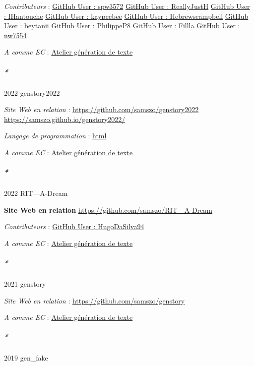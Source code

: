\documentclass[
  a4paper,
  DIV=11,
  numbers=noendperiod]{scrreprt}
\let\oldsubparagraph\subparagraph
\renewcommand{\subparagraph}[1]{\oldsubparagraph{#1}\mbox{}}
\begin{document}
\emph{Contributeurs} :
\href{http://localhost/samszo/omk/s/fiches/item/301047}{GitHub User :
spw3572} \href{http://localhost/samszo/omk/s/fiches/item/301049}{GitHub
User : ReallyJustH}
\href{http://localhost/samszo/omk/s/fiches/item/300833}{GitHub User :
IHantouche}
\href{http://localhost/samszo/omk/s/fiches/item/300841}{GitHub User :
kaypeebee}
\href{http://localhost/samszo/omk/s/fiches/item/301051}{GitHub User :
Hebrewscampbell}
\href{http://localhost/samszo/omk/s/fiches/item/301053}{GitHub User :
beytanii} \href{http://localhost/samszo/omk/s/fiches/item/300741}{GitHub
User : PhilippeP8}
\href{http://localhost/samszo/omk/s/fiches/item/301055}{GitHub User :
Fillla} \href{http://localhost/samszo/omk/s/fiches/item/301057}{GitHub
User : nw7554}

\emph{A comme EC} :
\href{http://localhost/samszo/omk/s/fiches/item/299446}{Atelier
génération de texte}

\subparagraph*{2022 genstory2022}\label{sec-item301828}

\emph{Site Web en relation} :
\url{https://github.com/samszo/genstory2022}
\url{https://samszo.github.io/genstory2022/}

\emph{Langage de programmation} :
\href{http://localhost/samszo/omk/s/fiches/item/96621}{html}

\emph{A comme EC} :
\href{http://localhost/samszo/omk/s/fiches/item/299446}{Atelier
génération de texte}

\subparagraph*{2022 RIT---A-Dream}\label{sec-item301874}

\textbf{Site Web en relation}
\href{https://github.com/samszo/RIT---A-Dream}{https://github.com/samszo/RIT---A-Dream}

\emph{Contributeurs} :
\href{http://localhost/samszo/omk/s/fiches/item/301513}{GitHub User :
HugoDaSilva94}

\emph{A comme EC} :
\href{http://localhost/samszo/omk/s/fiches/item/299446}{Atelier
génération de texte}

\subparagraph*{2021 genstory}\label{sec-item301888}

\emph{Site Web en relation} : \url{https://github.com/samszo/genstory}

\emph{A comme EC} :
\href{http://localhost/samszo/omk/s/fiches/item/299446}{Atelier
génération de texte}

\subparagraph*{2019 gen\_fake}\label{gen_fake}
\end{document}
